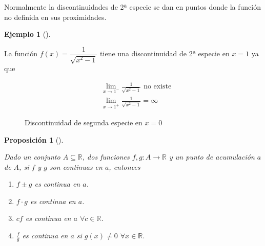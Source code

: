 \documentclass[
  a4paper,
]{scrreport}
\providecommand{\tightlist}{%
  \setlength{\itemsep}{0pt}\setlength{\parskip}{0pt}}\usepackage{longtable,booktabs,array}
\theoremstyle{plain}
\theoremstyle{plain}
\theoremstyle{definition}
\theoremstyle{plain}
\newtheorem{proposition}{Proposición}[chapter]
\theoremstyle{definition}
\newtheorem{example}{Ejemplo}[chapter]
\theoremstyle{remark}
\begin{document}
Normalmente la discontinuidades de 2ª especie se dan en puntos donde la
función no definida en sus proximidades.

\leavevmode{}%
\begin{example}[]\label{exm-discontinuidad-2-especie}

La función \(f(x)=\dfrac{1}{\sqrt{x^2-1}}\) tiene una discontinuidad de
2ª especie en \(x=1\) ya que

\begin{align*}
& \lim_{x\to 1^-}\frac{1}{\sqrt{x^2-1}} \textrm{ no existe}  \\
& \lim_{x\to 1^+}\frac{1}{\sqrt{x^2-1}}=\infty
\end{align*}

\begin{figure}

{\centering 



}

\caption{Discontinuidad de segunda especie en \(x=0\)}

\end{figure}

\end{example}

\leavevmode{}%
\begin{proposition}[]\label{prp-algebra-funciones-continuas}

Dado un conjunto \(A\subseteq \mathbb{R}\), dos funciones
\(f,g:A\to \mathbb{R}\) y un punto de acumulación \(a\) de \(A\), si
\(f\) y \(g\) son continuas en \(a\), entonces

\begin{enumerate}
\def\labelenumi{\alph{enumi}.}
\tightlist
\item
  \(f\pm g\) es continua en \(a\).
\item
  \(f\cdot g\) es continua en \(a\).
\item
  \(cf\) es continua en \(a\) \(\forall c\in\mathbb{R}\).
\item
  \(\frac{f}{g}\) es continua en \(a\) si \(g(x)\neq 0\)
  \(\forall x\in\mathbb{R}\).
\end{enumerate}

\end{proposition}
\end{document}
